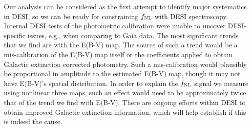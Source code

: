 Our analysis can be considered as the first attempt to identify major systematics in DESI, so we can be ready for constraining $f_{\rm NL}$ with DESI spectroscopy. Internal DESI tests of the photometric calibration were unable to uncover DESI-specific issues, e.g., when comparing to Gaia data. The most significant trends that we find are with the E(B-V) map. The source of such a trend would be a mis-calibration of the E(B-V) map itself or the coefficients applied to obtain Galactic extinction corrected photometry. Such a mis-calibration would plausibly be proportional in amplitude to the estimated E(B-V) map, though it may not have E(B-V)’s spatial distribution. In order to explain the $f_{\rm NL}$ signal we measure using nonlinear three maps, such an effect would need to be approximately twice that of the trend we find with E(B-V). There are ongoing efforts within DESI to obtain improved Galactic extinction information, which will help establish if this is indeed the cause.  
